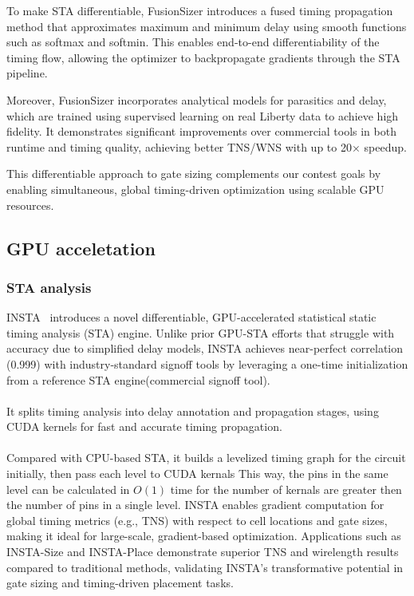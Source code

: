 \documentclass[conference]{IEEEtran}
\begin{document}
To make STA differentiable, FusionSizer introduces a fused timing propagation method that approximates maximum and minimum delay using smooth functions such as softmax and softmin. This enables end-to-end differentiability of the timing flow, allowing the optimizer to backpropagate gradients through the STA pipeline.

Moreover, FusionSizer incorporates analytical models for parasitics and delay, which are trained using supervised learning on real Liberty data to achieve high fidelity. It demonstrates significant improvements over commercial tools in both runtime and timing quality, achieving better TNS/WNS with up to 20× speedup.

This differentiable approach to gate sizing complements our contest goals by enabling simultaneous, global timing-driven optimization using scalable GPU resources.


\subsection{GPU acceletation}
\subsubsection{STA analysis}
INSTA~\cite{insta} introduces a novel differentiable, GPU-accelerated statistical static timing analysis (STA) engine. Unlike prior GPU-STA efforts that struggle with accuracy due to simplified delay models, INSTA achieves near-perfect correlation (0.999) with industry-standard signoff tools by leveraging a one-time initialization from a reference STA engine(commercial signoff tool). \\\\
It splits timing analysis into delay annotation and propagation stages, using CUDA kernels for fast and accurate timing propagation.\\\\
Compared with CPU-based STA, it builds a levelized timing graph for the circuit initially, then pass each level to CUDA kernals This way, the pins in the same level can be calculated in $O(1)$ time for the number of kernals are greater then the number of pins in a single level.  INSTA enables gradient computation for global timing metrics (e.g., TNS) with respect to cell locations and gate sizes, making it ideal for large-scale, gradient-based optimization. Applications such as INSTA-Size and INSTA-Place demonstrate superior TNS and wirelength results compared to traditional methods, validating INSTA’s transformative potential in gate sizing and timing-driven placement tasks.
\end{document}
